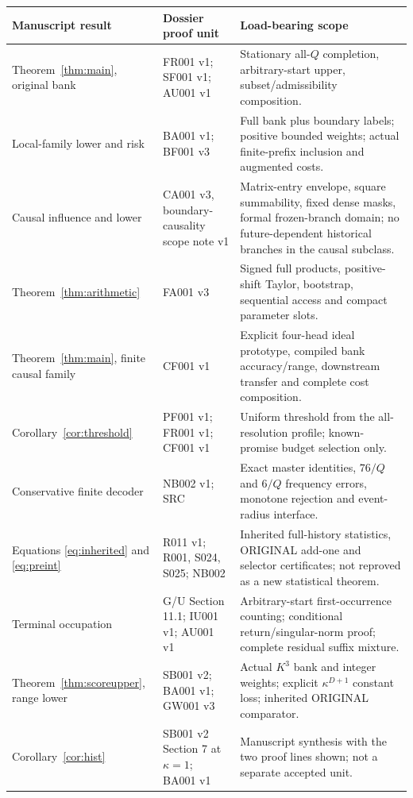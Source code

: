 \documentclass[11pt,letterpaper]{article}
\theoremstyle{definition}\newtheorem{definition}[theorem]{Definition}
\theoremstyle{remark}\newtheorem{remark}[theorem]{Remark}
\newcommand{\unit}[1]{\textsf{#1}}
\begin{document}
\begin{center}\small
\begin{longtable}{@{}>{\raggedright\arraybackslash}p{}>{\raggedright\arraybackslash}p{}>{\raggedright\arraybackslash}p{}@{}}
\toprule
Manuscript result & Dossier proof unit & Load-bearing scope\\\midrule\endhead
Theorem~\ref{thm:main}, original bank & \unit{FR001 v1}; \unit{SF001 v1}; \unit{AU001 v1} & Stationary all-$Q$ completion, arbitrary-start upper, subset/admissibility composition.\\[4pt]
Local-family lower and risk & \unit{BA001 v1}; \unit{BF001 v3} & Full bank plus boundary labels; positive bounded weights; actual finite-prefix inclusion and augmented costs.\\[4pt]
Causal influence and lower & \unit{CA001 v3}, boundary-causality scope note v1 & Matrix-entry envelope, square summability, fixed dense masks, formal frozen-branch domain; no future-dependent historical branches in the causal subclass.\\[4pt]
Theorem~\ref{thm:arithmetic} & \unit{FA001 v3} & Signed full products, positive-shift Taylor, bootstrap, sequential access and compact parameter slots.\\[4pt]
Theorem~\ref{thm:main}, finite causal family & \unit{CF001 v1} & Explicit four-head ideal prototype, compiled bank accuracy/range, downstream transfer and complete cost composition.\\[4pt]
Corollary~\ref{cor:threshold} & \unit{PF001 v1}; \unit{FR001 v1}; \unit{CF001 v1} & Uniform threshold from the all-resolution profile; known-promise budget selection only.\\[4pt]
Conservative finite decoder & \unit{NB002 v1}; \unit{SRC} & Exact master identities, $76/Q$ and $6/Q$ frequency errors, monotone rejection and event-radius interface.\\[4pt]
Equations \eqref{eq:inherited} and \eqref{eq:preint} & \unit{R011 v1}; \unit{R001}, \unit{S024}, \unit{S025}; \unit{NB002} & Inherited full-history statistics, ORIGINAL add-one and selector certificates; not reproved as a new statistical theorem.\\[4pt]
Terminal occupation & \unit{G/U} Section 11.1; \unit{IU001 v1}; \unit{AU001 v1} & Arbitrary-start first-occurrence counting; conditional return/singular-norm proof; complete residual suffix mixture.\\[4pt]
Theorem~\ref{thm:scoreupper}, range lower & \unit{SB001 v2}; \unit{BA001 v1}; \unit{GW001 v3} & Actual $K^3$ bank and integer weights; explicit $\kappa^{D+1}$ constant loss; inherited ORIGINAL comparator.\\[4pt]
Corollary~\ref{cor:hist} & \unit{SB001 v2} Section 7 at $\kappa=1$; \unit{BA001 v1} & Manuscript synthesis with the two proof lines shown; not a separate accepted unit.\\
\bottomrule
\end{longtable}
\end{center}
\end{document}
